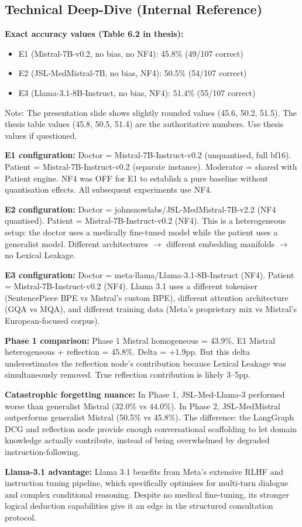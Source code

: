 \subsection*{Technical Deep-Dive (Internal Reference)}
{\color{techgray}
\textbf{Exact accuracy values (Table 6.2 in thesis):}
\begin{itemize}
  \item E1 (Mistral-7B-v0.2, no bias, no NF4): 45.8\% (49/107 correct)
  \item E2 (JSL-MedMistral-7B, no bias, NF4): 50.5\% (54/107 correct)
  \item E3 (Llama-3.1-8B-Instruct, no bias, NF4): 51.4\% (55/107 correct)
\end{itemize}
Note: The presentation slide shows slightly rounded values (45.6, 50.2, 51.5). The thesis table values (45.8, 50.5, 51.4) are the authoritative numbers. Use thesis values if questioned.

\textbf{E1 configuration:} Doctor = Mistral-7B-Instruct-v0.2 (unquantised, full bf16). Patient = Mistral-7B-Instruct-v0.2 (separate instance). Moderator = shared with Patient engine. NF4 was OFF for E1 to establish a pure baseline without quantisation effects. All subsequent experiments use NF4.

\textbf{E2 configuration:} Doctor = johnsnowlabs/JSL-MedMistral-7B-v2.2 (NF4 quantised). Patient = Mistral-7B-Instruct-v0.2 (NF4). This is a heterogeneous setup: the doctor uses a medically fine-tuned model while the patient uses a generalist model. Different architectures $\to$ different embedding manifolds $\to$ no Lexical Leakage.

\textbf{E3 configuration:} Doctor = meta-llama/Llama-3.1-8B-Instruct (NF4). Patient = Mistral-7B-Instruct-v0.2 (NF4). Llama 3.1 uses a different tokeniser (SentencePiece BPE vs Mistral's custom BPE), different attention architecture (GQA vs MQA), and different training data (Meta's proprietary mix vs Mistral's European-focused corpus).

\textbf{Phase 1 comparison:} Phase 1 Mistral homogeneous = 43.9\%. E1 Mistral heterogeneous + reflection = 45.8\%. Delta = +1.9pp. But this delta underestimates the reflection node's contribution because Lexical Leakage was simultaneously removed. True reflection contribution is likely 3--5pp.

\textbf{Catastrophic forgetting nuance:} In Phase 1, JSL-Med-Llama-3 performed worse than generalist Mistral (32.0\% vs 44.0\%). In Phase 2, JSL-MedMistral outperforms generalist Mistral (50.5\% vs 45.8\%). The difference: the LangGraph DCG and reflection node provide enough conversational scaffolding to let domain knowledge actually contribute, instead of being overwhelmed by degraded instruction-following.

\textbf{Llama-3.1 advantage:} Llama 3.1 benefits from Meta's extensive RLHF and instruction tuning pipeline, which specifically optimises for multi-turn dialogue and complex conditional reasoning. Despite no medical fine-tuning, its stronger logical deduction capabilities give it an edge in the structured consultation protocol.
}

